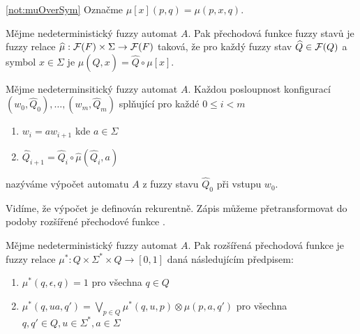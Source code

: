 \documentclass[a4paper,10pt]{article}
\begin{document}
\begin{notation} \ref{not:muOverSym}
 Označme $\mu[x](p, q) = \mu(p, x, q)$.
\end{notation}

\begin{definition}\label{def-PreFunFuzzStav}
 Mějme nedeterministický fuzzy automat $A$. Pak přechodová funkce fuzzy stavů je fuzzy relace $\widehat{\mu}: \mathcal{F}(F) \times \Sigma \rightarrow \mathcal{F}(F)$ taková, že pro každý fuzzy stav $\widehat{Q} \in \mathcal{F}(Q)$ a symbol $x \in \Sigma$ je $\widehat{\mu}(\widehat{Q}, x) = \widehat{Q} \circ \mu[x]$.
\end{definition}

\begin{definition}
  Mějme nedeterminsitický fuzzy automat $A$. Každou posloupnost konfigurací $(w_0, \widehat{Q}_0), \dots, (w_m, \widehat{Q}_m)$ splňující pro každé $0 \leq i < m$
  \begin{enumerate}
   \item $w_{i} = a w_{i+1}$ kde $a \in \Sigma$
   \item $\widehat{Q}_{i+1} = \widehat{Q}_{i} \circ \widehat{\mu}(\widehat{Q}_{i}, a)$
  \end{enumerate}
  nazýváme výpočet automatu $A$ z fuzzy stavu $\widehat{Q}_0$ při vstupu $w_0$.
\end{definition}

Vidíme, že výpočet je definován rekurentně. Zápis můžeme přetransformovat do podoby rozšířené přechodové funkce \cite{IgnCirBog-DetFuzAutMemValComResLat}.

\begin{definition}\label{def-RozPreFunFuzzStav}
 Mějme nedeterministický fuzzy automat $A$. Pak rozšířená přechodová funkce je fuzzy relace $\mu^*: Q \times \Sigma^* \times Q \rightarrow [0,1]$ daná následujícím předpisem:
 
 \begin{enumerate}
  \item $\mu^*(q, \epsilon, q) = 1$ pro všechna $q \in Q$
  \item $\mu^*(q, u a, q') =  \bigvee_{p \in Q} \mu^*(q, u, p) \otimes \mu(p, a, q')$ pro všechna $q, q' \in Q, u \in \Sigma^*, a \in \Sigma$
 \end{enumerate}
\end{definition}
\end{document}
